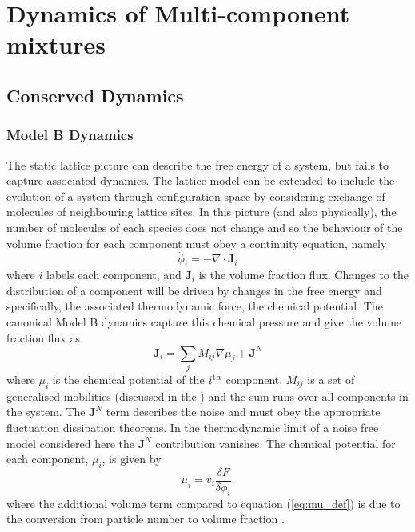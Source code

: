 \section{Dynamics of Multi-component mixtures}

\subsection{Conserved Dynamics}


\subsubsection{Model B Dynamics}
The static lattice picture can describe the free energy of a system, but fails to capture associated dynamics. The lattice model can be extended to include the evolution of a system through configuration space by considering exchange of molecules of neighbouring lattice sites. In this picture (and also physically), the number of molecules of each species does not change and so the behaviour of the volume fraction for each component must obey a continuity equation, namely\cite{li_non-equilibrium_2020}
\begin{equation}
    \dot{\phi}_i = - \nabla \cdot \textbf{J}_i
    \label{eq:continuityModB}
\end{equation}
 where $i$ labels each component, and $\textbf{J}_i$ is the volume fraction flux.  Changes to the distribution of a component will be driven by changes in the free energy and specifically, the associated thermodynamic force, the chemical potential. The canonical Model B dynamics capture this chemical pressure and give the volume fraction flux as
\begin{equation}
    \textbf{J}_i = \sum_j M_{ij}\nabla\mu_j + \textbf{J}^N
    \label{eq:fluxModB}
\end{equation}
where $\mu_i$ is the chemical potential of the $i\textsuperscript{th}$ component, $M_{ij}$ is a set of generalised mobilities (discussed in the ) and the sum runs over all components in the system. The $\textbf{J}^N$ term describes the noise and must obey the appropriate fluctuation dissipation theorems. In the thermodynamic limit of a noise free model considered here the $ \textbf{J}^N$ contribution vanishes. The chemical potential for each component, $\mu_i$, is given by
\begin{equation}
    \mu_i = v_i\frac{\delta F}{\delta \phi_i}.
\end{equation}
where the additional volume term compared to equation (\ref{eq:mu_def}) is due to the conversion from particle number to volume fraction .

